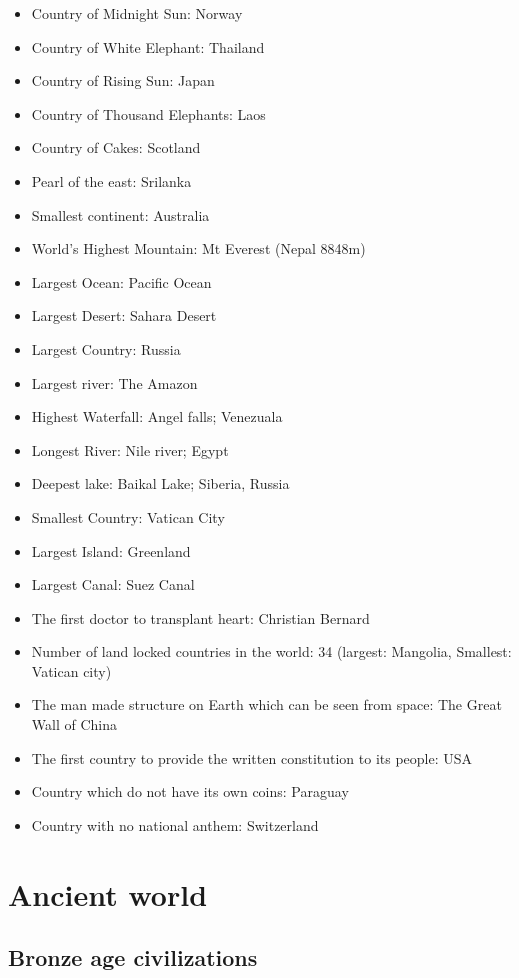 \documentclass[
  openany]{book}
\begin{document}
\begin{itemize}
\item
  Country of Midnight Sun: Norway
\item
  Country of White Elephant: Thailand
\item
  Country of Rising Sun: Japan
\item
  Country of Thousand Elephants: Laos
\item
  Country of Cakes: Scotland
\item
  Pearl of the east: Srilanka
\item
  Smallest continent: Australia
\item
  World's Highest Mountain: Mt Everest (Nepal 8848m)
\item
  Largest Ocean: Pacific Ocean
\item
  Largest Desert: Sahara Desert
\item
  Largest Country: Russia
\item
  Largest river: The Amazon
\item
  Highest Waterfall: Angel falls; Venezuala
\item
  Longest River: Nile river; Egypt
\item
  Deepest lake: Baikal Lake; Siberia, Russia
\item
  Smallest Country: Vatican City
\item
  Largest Island: Greenland
\item
  Largest Canal: Suez Canal
\item
  The first doctor to transplant heart: Christian Bernard
\item
  Number of land locked countries in the world: 34 (largest: Mangolia, Smallest: Vatican city)
\item
  The man made structure on Earth which can be seen from space: The Great Wall of China
\item
  The first country to provide the written constitution to its people: USA
\item
  Country which do not have its own coins: Paraguay
\item
  Country with no national anthem: Switzerland
\end{itemize}

\hypertarget{ancient-world}{%
\section{Ancient world}\label{ancient-world}}

\hypertarget{bronze-age-civilizations}{%
\subsection{Bronze age civilizations}\label{bronze-age-civilizations}}
\end{document}
